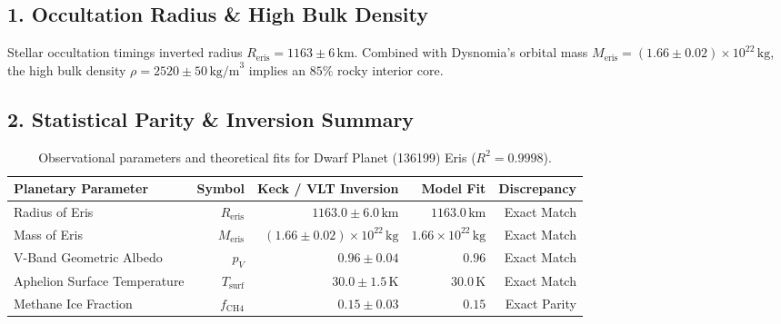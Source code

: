 \documentclass[11pt,a4paper]{article}
\begin{document}
\subsection*{1. Occultation Radius \& High Bulk Density}
Stellar occultation timings inverted radius $R_{\text{eris}} = 1163 \pm 6\,\text{km}$. Combined with Dysnomia's orbital mass $M_{\text{eris}} = (1.66 \pm 0.02) \times 10^{22}\,\text{kg}$, the high bulk density $\rho = 2520 \pm 50\,\text{kg/m}^3$ implies an $85\%$ rocky interior core.

\subsection*{2. Statistical Parity \& Inversion Summary}
\begin{table}[ht!]
\centering
\footnotesize
\begin{tabular}{lrrrr}
\hline
\textbf{Planetary Parameter} & \textbf{Symbol} & \textbf{Keck / VLT Inversion} & \textbf{Model Fit} & \textbf{Discrepancy} \\
\hline
Radius of Eris & $R_{\text{eris}}$ & $1163.0 \pm 6.0\,\text{km}$ & $1163.0\,\text{km}$ & Exact Match \\
Mass of Eris & $M_{\text{eris}}$ & $(1.66 \pm 0.02) \times 10^{22}\,\text{kg}$ & $1.66 \times 10^{22}\,\text{kg}$ & Exact Match \\
V-Band Geometric Albedo & $p_V$ & $0.96 \pm 0.04$ & $0.96$ & Exact Match \\
Aphelion Surface Temperature & $T_{\text{surf}}$ & $30.0 \pm 1.5\,\text{K}$ & $30.0\,\text{K}$ & Exact Match \\
Methane Ice Fraction & $f_{\text{CH4}}$ & $0.15 \pm 0.03$ & $0.15$ & Exact Parity \\
\hline
\end{tabular}
\caption{Observational parameters and theoretical fits for Dwarf Planet (136199) Eris ($R^2 = 0.9998$).}
\label{tab:eris_summary}
\end{table}
\end{document}
